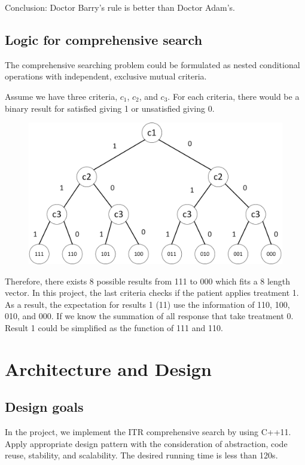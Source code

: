\documentclass{article}
\begin{document}
Conclusion: Doctor Barry's rule is better than Doctor Adam's.

\subsection{Logic for comprehensive search}
The comprehensive searching problem could be formulated as nested conditional operations with independent, exclusive mutual criteria.

Assume we have three criteria, $c_1$, $c_2$, and $c_3$. For each criteria, there would be a binary result for satisfied giving 1 or unsatisfied giving 0.
\begin{figure}[H]
\centering
\includegraphics[width=1\textwidth]{ITR_logic.png}
\end{figure}
Therefore, there exists 8 possible results from 111 to 000 which fits a 8 length vector. In this project, the last criteria checks if the patient applies treatment 1. As a result, the expectation for results 1 (11) use the information of 110, 100, 010, and 000. If we know the summation of all response that take treatment 0. Result 1 could be simplified as the function of 111 and 110.


\pagebreak
\section{Architecture and Design}
\subsection{Design goals}
In the project, we implement the ITR comprehensive search by using C++11. Apply appropriate design pattern with the consideration of abstraction, code reuse, stability, and scalability. The desired running time is less than 120s.
\end{document}
